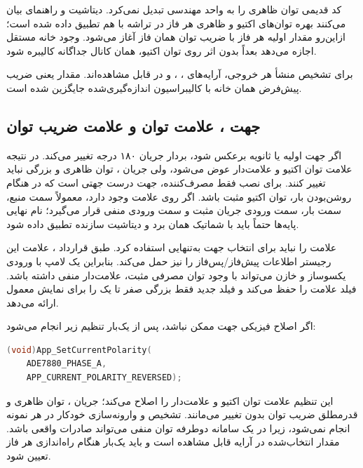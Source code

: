 کد قدیمی توان ظاهری را به واحد مهندسی تبدیل نمی‌کرد. دیتاشیت  و راهنمای  بیان می‌کنند بهره توان‌های اکتیو و ظاهری هر فاز در تراشه با هم تطبیق داده شده است؛ ازاین‌رو مقدار اولیه  هر فاز با ضریب توان همان فاز آغاز می‌شود. وجود خانه مستقل  اجازه می‌دهد بعداً بدون اثر روی توان اکتیو، همان کانال جداگانه کالیبره شود.

برای تشخیص منشأ هر خروجی، آرایه‌های
،
،
و
در  قابل مشاهده‌اند. مقدار
یعنی ضریب پیش‌فرض همان خانه با کالیبراسیون اندازه‌گیری‌شده جایگزین شده است.

\subsection{جهت ، علامت توان و علامت ضریب توان}
اگر جهت اولیه یا ثانویه  برعکس شود، بردار جریان ۱۸۰ درجه تغییر می‌کند. در نتیجه علامت توان اکتیو و  علامت‌دار عوض می‌شود، ولی جریان ، توان ظاهری و بزرگی  نباید تغییر کنند. برای نصب فقط مصرف‌کننده، جهت درست جهتی است که در هنگام روشن‌بودن بار، توان اکتیو مثبت باشد. اگر روی  علامت وجود دارد، معمولاً  سمت منبع،  سمت بار،  سمت ورودی جریان مثبت و  سمت ورودی منفی قرار می‌گیرد؛ نام نهایی پایه‌ها حتماً باید با شماتیک همان برد و دیتاشیت سازنده  تطبیق داده شود.

علامت  را نباید برای انتخاب جهت  به‌تنهایی استفاده کرد. طبق قرارداد ، علامت این رجیستر اطلاعات پیش‌فاز/پس‌فاز را نیز حمل می‌کند. بنابراین یک لامپ  با ورودی یکسوساز و خازن می‌تواند با وجود توان مصرفی مثبت،  علامت‌دار منفی داشته باشد. فیلد
علامت را حفظ می‌کند و فیلد جدید
فقط بزرگی صفر تا یک را برای نمایش معمول ارائه می‌دهد.

اگر اصلاح فیزیکی جهت ممکن نباشد، پس از  یک‌بار تنظیم زیر انجام می‌شود:

\begin{LTR}
\begin{lstlisting}[language=C]
(void)App_SetCurrentPolarity(
    ADE7880_PHASE_A,
    APP_CURRENT_POLARITY_REVERSED);
\end{lstlisting}
\end{LTR}

این تنظیم علامت توان اکتیو و  علامت‌دار را اصلاح می‌کند؛ جریان ، توان ظاهری و قدرمطلق ضریب توان بدون تغییر می‌مانند. تشخیص و وارونه‌سازی خودکار در هر نمونه انجام نمی‌شود، زیرا در یک سامانه دوطرفه توان منفی می‌تواند صادرات واقعی باشد. مقدار انتخاب‌شده در آرایه
قابل مشاهده است و باید یک‌بار هنگام راه‌اندازی هر فاز تعیین شود.


